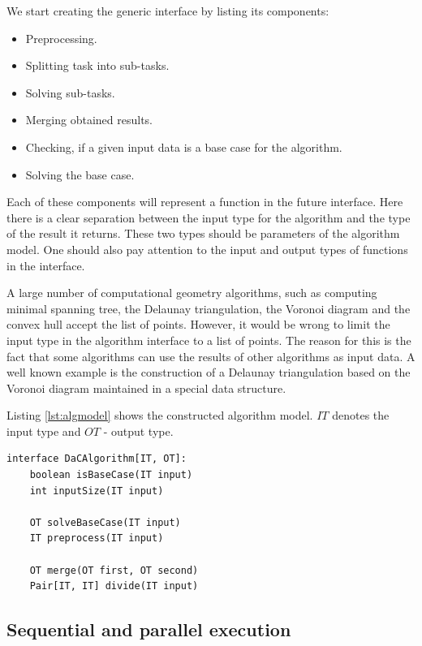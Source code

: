 \documentclass[a4paper,UKenglish,cleveref, autoref]{socg-lipics-v2019}
\begin{document}
	We start creating the generic interface by listing its components:
	
	\begin{itemize}
		\item 
		Preprocessing.
		\item 
		Splitting task into sub-tasks.
		\item 
		Solving sub-tasks.
		\item 
		Merging obtained results.
		\item 
		Checking, if a given input data is a base case for the algorithm.
		\item 
		Solving the base case.
	\end{itemize}
	
	Each of these components will represent a function in the future interface. Here there is a clear separation between the input type for the algorithm and the type of the result it returns. These two types should be parameters of the algorithm model. One should also pay attention to the input and output types of functions  in the interface.
	
	A large number of computational geometry algorithms, such as computing minimal spanning tree, the Delaunay triangulation, the Voronoi diagram and the convex hull accept the list of points. However, it would be wrong to limit the input type in the algorithm interface to a list of points. The reason for this is the fact that some algorithms can use the results of other algorithms as input data. A well known example is the construction of a Delaunay triangulation based on the Voronoi diagram maintained in a special data structure.
	
	Listing \ref{lst:algmodel} shows the constructed algorithm model. $IT$ denotes the input type and $OT$ - output type.
	
	\begin{lstlisting}[caption={Algorithm model based on the ``divide-and-conquer'' principle},label={lst:algmodel},captionpos=t,float,abovecaptionskip=-\medskipamount]
interface DaCAlgorithm[IT, OT]:
    boolean isBaseCase(IT input)
    int inputSize(IT input)

    OT solveBaseCase(IT input)
    IT preprocess(IT input)

    OT merge(OT first, OT second)
    Pair[IT, IT] divide(IT input)
	\end{lstlisting}
	
	
\subsection{Sequential and parallel execution}
	
\end{document}
